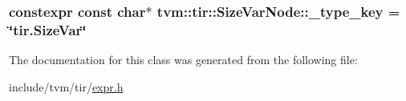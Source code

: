 \subsubsection[{\texorpdfstring{\+\_\+type\+\_\+key}{_type_key}}]{\setlength{\rightskip}{0pt plus 5cm}constexpr const char$\ast$ tvm\+::tir\+::\+Size\+Var\+Node\+::\+\_\+type\+\_\+key = \char`\"{}tir.\+Size\+Var\char`\"{}\hspace{0.3cm}{\ttfamily [static]}}\hypertarget{classtvm_1_1tir_1_1SizeVarNode_afb8eba79487ed933d8777515250b0f73}{}\label{classtvm_1_1tir_1_1SizeVarNode_afb8eba79487ed933d8777515250b0f73}


The documentation for this class was generated from the following file\+:\begin{DoxyCompactItemize}
\item 
include/tvm/tir/\hyperlink{tir_2expr_8h}{expr.\+h}\end{DoxyCompactItemize}
